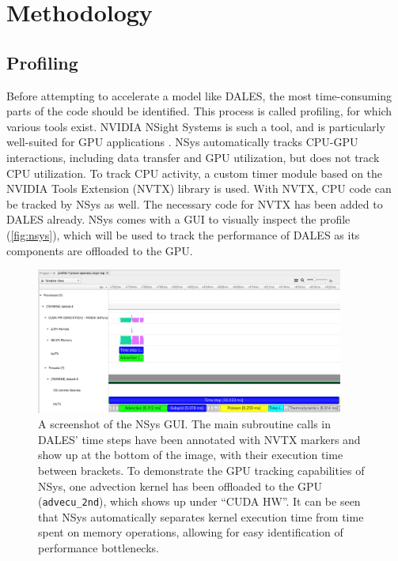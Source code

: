 \section{Methodology}

\subsection{Profiling}
Before attempting to accelerate a model like DALES, the most time-consuming parts of the code should be identified. This process is called profiling, for which various tools exist. NVIDIA NSight Systems is such a tool, and is particularly well-suited for GPU applications \citep{nvidiaNVIDIANsightSystems}. NSys automatically tracks CPU-GPU interactions, including data transfer and GPU utilization, but does not track CPU utilization. To track CPU activity, a custom timer module based on the NVIDIA Tools Extension (NVTX) library is used. With NVTX, CPU code can be tracked by NSys as well. The necessary code for NVTX has been added to DALES already. NSys comes with a GUI to visually inspect the profile (\autoref{fig:nsys}), which will be used to track the performance of DALES as its components are offloaded to the GPU.

\begin{figure}[H]
    \centering
    \includegraphics[width=0.9\textwidth]{doc/images/profiles/nsys.png}
    \caption{A screenshot of the NSys GUI. The main subroutine calls in DALES' time steps have been annotated with NVTX markers and show up at the bottom of the image, with their execution time between brackets. To demonstrate the GPU tracking capabilities of NSys, one advection kernel has been offloaded to the GPU (\texttt{advecu\_2nd}), which shows up under ``CUDA HW''. It can be seen that NSys automatically separates kernel execution time from time spent on memory operations, allowing for easy identification of performance bottlenecks.}
    \label{fig:nsys}
\end{figure}

